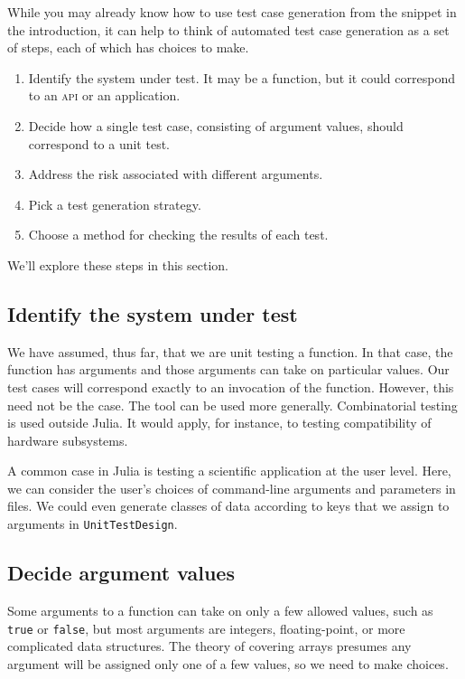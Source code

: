 \documentclass{juliacon}
\newcommand{\utd}{\texttt{UnitTestDesign}\xspace}
\begin{document}
While you may already know how to use test case generation from the snippet in the introduction, it can help to think of automated test case generation as a set of steps, each of which has choices to make.
\begin{enumerate}
   \item Identify the system under test. It may be a function, but it could correspond to an \textsc{api} or an application.
   \item Decide how a single test case, consisting of argument values, should correspond to a unit test.
   \item Address the risk associated with different arguments.
   \item Pick a test generation strategy.
   \item Choose a method for checking the results of each test.
\end{enumerate}
We'll explore these steps in this section.

\subsection{Identify the system under test}

We have assumed, thus far, that we are unit testing a function. In that case, the function has arguments and those arguments can take on particular values. Our test cases will correspond exactly to an invocation of the function. However, this need not be the case. The tool can be used more generally. Combinatorial testing is used outside Julia. It would apply, for instance, to testing compatibility of hardware subsystems.

A common case in Julia is testing a scientific application at the user level. Here, we can consider the user's choices of command-line arguments and parameters in files. We could even generate classes of data according to keys that we assign to arguments in \utd.

\subsection{Decide argument values}

Some arguments to a function can take on only a few allowed values, such as \verb|true| or \verb|false|, but most arguments are integers, floating-point, or more complicated data structures. The theory of covering arrays presumes any argument will be assigned only one of a few values, so we need to make choices.
\end{document}
